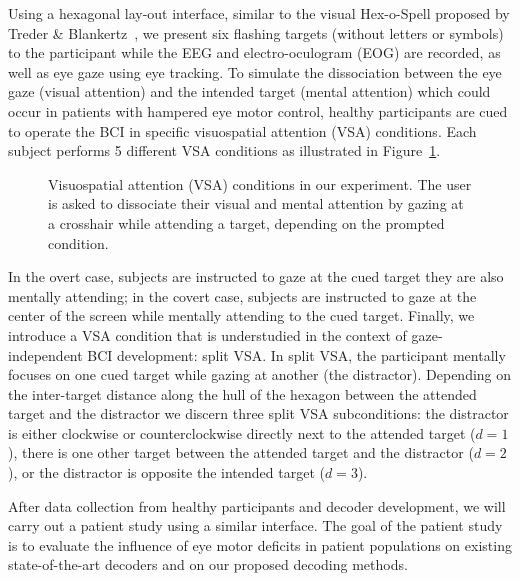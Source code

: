 Using a hexagonal lay-out interface, similar to the visual Hex-o-Spell proposed
by Treder \& Blankertz~\cite{Treder2010}, we present six flashing targets (without letters or
symbols) to the participant while the EEG and electro-oculogram (EOG) are
recorded, as well as eye gaze using eye tracking.
To simulate the dissociation between the eye gaze (visual attention) and the
intended target (mental attention) which could occur in patients with hampered eye
motor control, healthy participants are cued to operate the BCI in specific
visuospatial attention (VSA) conditions.
Each subject performs 5 different VSA conditions as illustrated in
Figure~\ref{fig:vsa-conditions}.
\begin{figure}
	\caption{Visuospatial attention (VSA) conditions in our experiment. The user is
		asked to dissociate their visual and mental attention by gazing at a
		crosshair while attending a target, depending on the prompted condition.}%
	\label{fig:vsa-conditions}
\end{figure}
In the overt case, subjects are instructed to gaze at the cued
target they are also mentally attending; in the covert case, subjects are instructed
to gaze at the center of the screen while mentally attending to the cued target.
Finally, we introduce a VSA condition that is understudied in the context of
gaze-independent BCI development: split VSA.
In split VSA, the participant mentally focuses on one cued target while gazing at
another (the distractor).
Depending on the inter-target distance along the hull of the hexagon between the
attended target and the distractor we discern three split VSA subconditions:
the distractor is either clockwise or counterclockwise directly next to the
attended target ($d=1$), there is one other target between the attended target and
the distractor ($d=2$), or the distractor is opposite the intended target
($d=3$).


After data collection from healthy participants and decoder development, we
will carry out a patient study using a similar interface.
The goal of the patient study is to evaluate the influence of eye motor
deficits in patient populations on existing state-of-the-art decoders and on
our proposed decoding methods.

